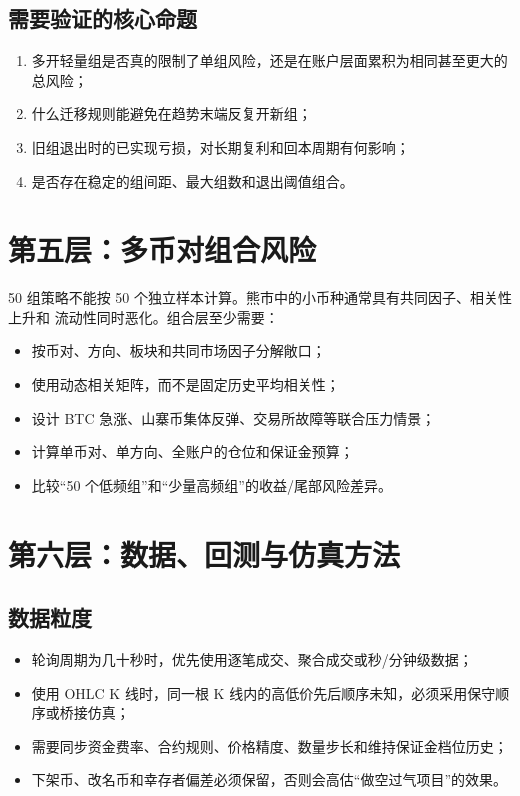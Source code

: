 \documentclass[11pt,a4paper,fontset=none]{ctexart}
\begin{document}
\subsection{需要验证的核心命题}

\begin{enumerate}
  \item 多开轻量组是否真的限制了单组风险，还是在账户层面累积为相同甚至更大的总风险；
  \item 什么迁移规则能避免在趋势末端反复开新组；
  \item 旧组退出时的已实现亏损，对长期复利和回本周期有何影响；
  \item 是否存在稳定的组间距、最大组数和退出阈值组合。
\end{enumerate}

\section{第五层：多币对组合风险}

50 组策略不能按 50 个独立样本计算。熊市中的小币种通常具有共同因子、相关性上升和
流动性同时恶化。组合层至少需要：

\begin{itemize}
  \item 按币对、方向、板块和共同市场因子分解敞口；
  \item 使用动态相关矩阵，而不是固定历史平均相关性；
  \item 设计 BTC 急涨、山寨币集体反弹、交易所故障等联合压力情景；
  \item 计算单币对、单方向、全账户的仓位和保证金预算；
  \item 比较“50 个低频组”和“少量高频组”的收益/尾部风险差异。
\end{itemize}

\section{第六层：数据、回测与仿真方法}

\subsection{数据粒度}

\begin{itemize}
  \item 轮询周期为几十秒时，优先使用逐笔成交、聚合成交或秒/分钟级数据；
  \item 使用 OHLC K 线时，同一根 K 线内的高低价先后顺序未知，必须采用保守顺序或桥接仿真；
  \item 需要同步资金费率、合约规则、价格精度、数量步长和维持保证金档位历史；
  \item 下架币、改名币和幸存者偏差必须保留，否则会高估“做空过气项目”的效果。
\end{itemize}
\end{document}
